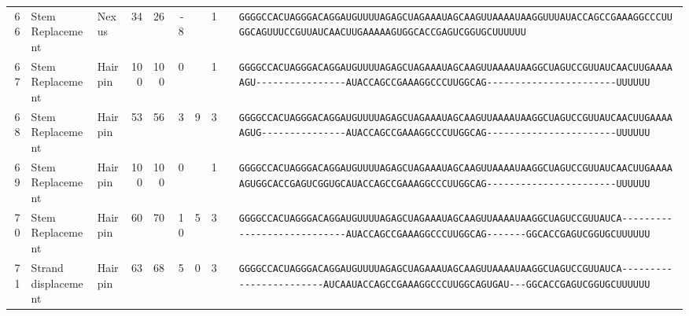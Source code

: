 \begin{tabular}{rllrrrrrcl}
 66 & Stem Replacement & Nexus & 34 & 26 & -8 &  & 1 &  &
 \color{ucsfblack}\verb|GGGGCCACUAGGGACAGGAU|\color{ucsfblue}\verb|GUUUUAGAGCUAGAAAUAGCAAGUUAAAAU|\color{ucsfnavy}\verb|AAGGUUU|\color{ucsfpurple}\verb|AUACCAGCCGAAAGGCCCUUGGCAG|\color{ucsfnavy}\verb|UUUCCGU|\color{ucsfteal}\verb|UAUCAACUUGAAAAAGUGGCACCGAGUCGGUGC|\color{ucsfblack}\verb|UUUUUU| \\

 67 & Stem Replacement & Hairpin & 100 & 100 & 0 &  & 1 &  &
 \color{ucsfblack}\verb|GGGGCCACUAGGGACAGGAU|\color{ucsfblue}\verb|GUUUUAGAGCUAGAAAUAGCAAGUUAAAAU|\color{ucsfnavy}\verb|AAGGCUAGUCCGU|\color{ucsfteal}\verb|UAUCAACUUGAAAAAGU----------------|\color{ucsfpurple}\verb|AUACCAGCCGAAAGGCCCUUGGCAG|\color{ucsfteal}\verb|-----------------------|\color{ucsfblack}\verb|UUUUUU| \\

 68 & Stem Replacement & Hairpin & 53 & 56 & 3 & 9 & 3 &  &
 \color{ucsfblack}\verb|GGGGCCACUAGGGACAGGAU|\color{ucsfblue}\verb|GUUUUAGAGCUAGAAAUAGCAAGUUAAAAU|\color{ucsfnavy}\verb|AAGGCUAGUCCGU|\color{ucsfteal}\verb|UAUCAACUUGAAAAAGUG---------------|\color{ucsfpurple}\verb|AUACCAGCCGAAAGGCCCUUGGCAG|\color{ucsfteal}\verb|-----------------------|\color{ucsfblack}\verb|UUUUUU| \\

 69 & Stem Replacement & Hairpin & 100 & 100 & 0 &  & 1 &  &
 \color{ucsfblack}\verb|GGGGCCACUAGGGACAGGAU|\color{ucsfblue}\verb|GUUUUAGAGCUAGAAAUAGCAAGUUAAAAU|\color{ucsfnavy}\verb|AAGGCUAGUCCGU|\color{ucsfteal}\verb|UAUCAACUUGAAAAAGUGGCACCGAGUCGGUGC|\color{ucsfpurple}\verb|AUACCAGCCGAAAGGCCCUUGGCAG|\color{ucsfteal}\verb|-----------------------|\color{ucsfblack}\verb|UUUUUU| \\

 70 & Stem Replacement & Hairpin & 60 & 70 & 10 & 5 & 3 &  &
 \color{ucsfblack}\verb|GGGGCCACUAGGGACAGGAU|\color{ucsfblue}\verb|GUUUUAGAGCUAGAAAUAGCAAGUUAAAAU|\color{ucsfnavy}\verb|AAGGCUAGUCCGU|\color{ucsfteal}\verb|UAUCA----------------------------|\color{ucsfpurple}\verb|AUACCAGCCGAAAGGCCCUUGGCAG|\color{ucsfteal}\verb|-------GGCACCGAGUCGGUGC|\color{ucsfblack}\verb|UUUUUU| \\

 71 & Strand displacement & Hairpin & 63 & 68 & 5 & 0 & 3 &  &
 \color{ucsfblack}\verb|GGGGCCACUAGGGACAGGAU|\color{ucsfblue}\verb|GUUUUAGAGCUAGAAAUAGCAAGUUAAAAU|\color{ucsfnavy}\verb|AAGGCUAGUCCGU|\color{ucsfteal}\verb|UAUCA------------------------AUCA|\color{ucsfpurple}\verb|AUACCAGCCGAAAGGCCCUUGGCAG|\color{ucsfteal}\verb|UGAU---GGCACCGAGUCGGUGC|\color{ucsfblack}\verb|UUUUUU| \\


\end{tabular}

